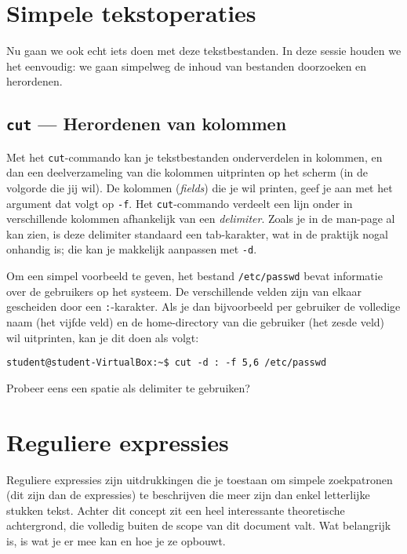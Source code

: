 \documentclass[a4paper,twoside,openany]{memoir}
\begin{document}
\chapter{Simpele tekstoperaties}

Nu gaan we ook echt iets doen met deze tekstbestanden. In deze sessie houden we
het eenvoudig: we gaan simpelweg de inhoud van bestanden doorzoeken en
herordenen.

\section{\texttt{cut} --- Herordenen van kolommen}

Met het \verb!cut!-commando kan je tekstbestanden onderverdelen in kolommen, en
dan een deelverzameling van die kolommen uitprinten op het scherm (in de
volgorde die jij wil). De kolommen (\emph{fields}) die je wil printen, geef je
aan met het argument dat volgt op \verb!-f!. Het \verb!cut!-commando verdeelt
een lijn onder in verschillende kolommen afhankelijk van een \emph{delimiter}.
Zoals je in de man-page al kan zien, is deze delimiter standaard een
tab-karakter, wat in de praktijk nogal onhandig is; die kan je makkelijk
aanpassen met \verb!-d!.

Om een simpel voorbeeld te geven, het bestand \verb!/etc/passwd! bevat
informatie over de gebruikers op het systeem. De verschillende velden zijn van
elkaar gescheiden door een \verb!:!-karakter. Als je dan bijvoorbeeld per
gebruiker de volledige naam (het vijfde veld) en de home-directory van die
gebruiker (het zesde veld) wil uitprinten, kan je dit doen als volgt:

\begin{verbatim}
student@student-VirtualBox:~$ cut -d : -f 5,6 /etc/passwd
\end{verbatim}

Probeer eens een spatie als delimiter te gebruiken?

\chapter{Reguliere expressies}

Reguliere expressies zijn uitdrukkingen die je toestaan om simpele zoekpatronen
(dit zijn dan de expressies) te beschrijven die meer zijn dan enkel letterlijke
stukken tekst. Achter dit concept zit een heel interessante theoretische
achtergrond, die volledig buiten de scope van dit document valt. Wat belangrijk
is, is wat je er mee kan en hoe je ze opbouwt.
\end{document}
